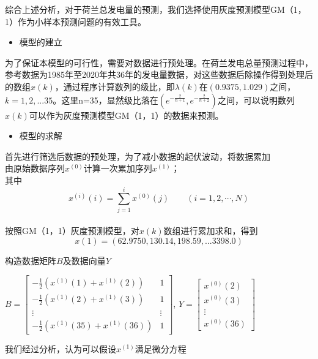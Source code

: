 \documentclass[bwprint]{gmcmthesis}
\numberwithin{figure}{section}
\begin{document}
综合上述分析，对于荷兰总发电量的预测，我们选择使用灰度预测模型GM（1，1）作为小样本预测问题的有效工具。

\begin{itemize}
	\item 模型的建立
\end{itemize}

为了保证本模型的可行性，需要对数据进行预处理。在荷兰发电总量预测过程中，参考数据为1985年至2020年共36年的发电量数据，对这些数据后除操作得到处理后的数组$x(k)$，通过程序计算数列的级比，即$\lambda(k)$在$(0.9375,1.029)$之间，$k=1,2,...35$。这里n=35，显然级比落在$(e^{-\frac{2}{n+1}},e^{-\frac{2}{n+2}})$之间，可以说明数列$x(k)$可以作为灰度预测模型GM（1，1）的数据来预测。

\begin{itemize}
	\item 模型的求解
\end{itemize}

首先进行筛选后数据的预处理，为了减小数据的起伏波动，将数据累加
\\由原始数据序列$x^{(0)}$计算一次累加序列$x^{(1)}$；\\
其中
\[
	x^{(i)}(i)=\sum_{j=1}^ix^{(0)}(j)\qquad(i=1,2,\cdots ,N)
\]
\\
按照GM（1，1）灰度预测模型，对$x(k)$数组进行累加求和，得到\[x(1)=(62.9750,130.14,198.59,...3398.0)\]

构造数据矩阵$B$及数据向量$Y$

\qquad$B=\begin{bmatrix}-\frac{1}{2}(x^{(1)}(1)+x^{(1)}(2)) & 1\\-\frac{1}{2}(x^{(1)}(2)+x^{(1)}(3)) & 1\\ \vdots & \vdots \\-\frac{1}{2}(x^{(1)}(35)+x^{(1)}(36)) & 1\end{bmatrix}$, \qquad $Y=\begin{bmatrix}x^{(0)}(2)\\x^{(0)}(3)\\ \vdots \\x^{(0)}(36) \end{bmatrix}$

我们经过分析，认为可以假设$x^{(1)}$满足微分方程
\end{document}

